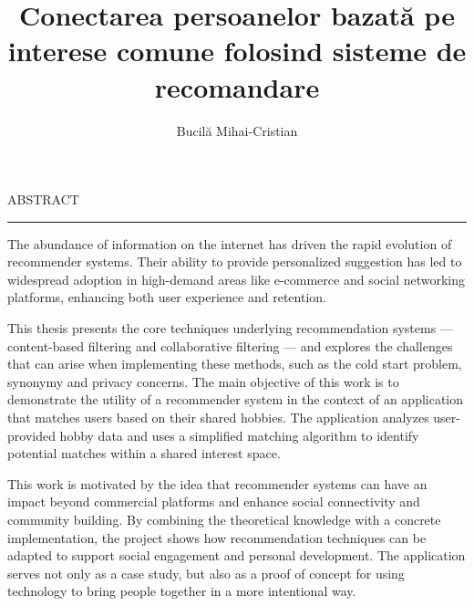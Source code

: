 \documentclass[12pt]{report}
\begin{document}
\title{Conectarea persoanelor bazată pe interese comune folosind sisteme de recomandare}					   
\author{Bucilă Mihai-Cristian}											
				
\maketitle


\newpage
\thispagestyle{empty}
\mbox{}
\newpage
{} 

\cleardoublepage
ABSTRACT
\vspace{0.5cm}	
\hrule
\vspace{0.5cm}	

\par
The abundance of information on the internet has driven the rapid evolution of recommender systems.
Their ability to provide personalized suggestion has led to widespread adoption in high-demand areas like e-commerce and social networking platforms, enhancing both user experience and retention.
\par
This thesis presents the core techniques underlying recommendation systems --- content-based filtering and collaborative filtering --- and explores the challenges that can arise when implementing these methods, such as the cold start problem, synonymy and privacy concerns.
The main objective of this work is to demonstrate the utility of a recommender system in the context of an application that matches users based on their shared hobbies.
The application analyzes user-provided hobby data and uses a simplified matching algorithm to identify potential matches within a shared interest space.
\par
This work is motivated by the idea that recommender systems can have an impact beyond commercial platforms and enhance social connectivity and community building.
By combining the theoretical knowledge with a concrete implementation, the project shows how recommendation techniques can be adapted to support social engagement and personal development.
The application serves not only as a case study, but also as a proof of concept for using technology to bring people together in a more intentional way.

\tableofcontents


\newpage
{}










\end{document}
